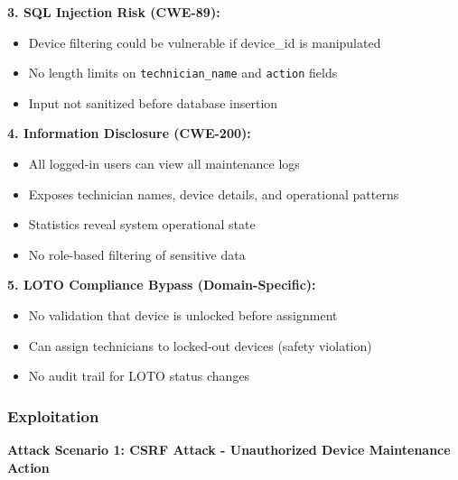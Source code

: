 \documentclass[12pt,a4paper]{article}
\begin{document}
\textbf{3. SQL Injection Risk (CWE-89):}
\begin{itemize}[leftmargin=*]
    \item Device filtering could be vulnerable if device\_id is manipulated
    \item No length limits on \texttt{technician\_name} and \texttt{action} fields
    \item Input not sanitized before database insertion
\end{itemize}

\textbf{4. Information Disclosure (CWE-200):}
\begin{itemize}[leftmargin=*]
    \item All logged-in users can view all maintenance logs
    \item Exposes technician names, device details, and operational patterns
    \item Statistics reveal system operational state
    \item No role-based filtering of sensitive data
\end{itemize}

\textbf{5. LOTO Compliance Bypass (Domain-Specific):}
\begin{itemize}[leftmargin=*]
    \item No validation that device is unlocked before assignment
    \item Can assign technicians to locked-out devices (safety violation)
    \item No audit trail for LOTO status changes
\end{itemize}

\subsubsection{Exploitation}

\textbf{Attack Scenario 1: CSRF Attack - Unauthorized Device Maintenance Action}
\end{document}
